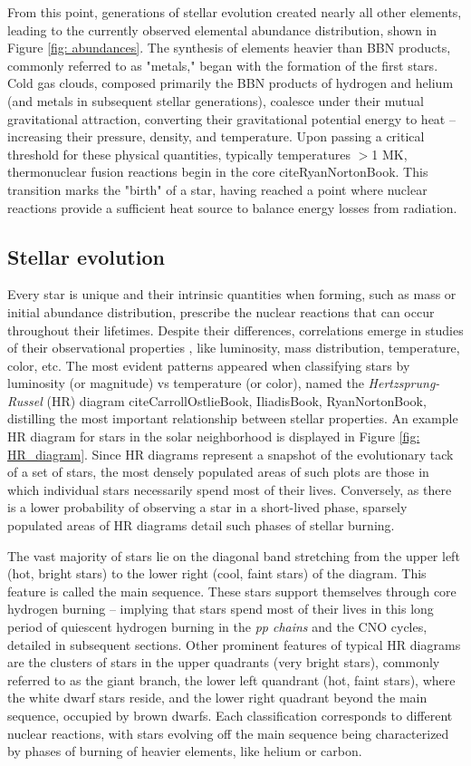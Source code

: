 From this point, generations of stellar evolution created nearly all other elements, leading to the currently observed elemental abundance distribution, shown in Figure \ref{fig: abundances}. The synthesis of elements heavier than BBN products, commonly referred to as "metals," began with the formation of the first stars. Cold gas clouds, composed primarily the BBN products of hydrogen and helium (and metals in subsequent stellar generations), coalesce under their mutual gravitational attraction, converting their gravitational potential energy to heat -- increasing their pressure, density, and temperature. Upon passing a critical threshold for these physical quantities, typically temperatures $>$1 MK, thermonuclear fusion reactions begin in the core cite{RyanNortonBook}. This transition marks the "birth" of a star, having reached a point where nuclear reactions provide a sufficient heat source to balance energy losses from radiation. 


\subsection{Stellar evolution}

Every star is unique and their intrinsic quantities when forming, such as mass or initial abundance distribution, prescribe the nuclear reactions that can occur throughout their lifetimes. Despite their differences, correlations emerge in studies of their observational properties , like luminosity, mass distribution, temperature, color, etc. The most evident patterns appeared when classifying stars by luminosity (or magnitude) vs temperature (or color), named the \textit{Hertzsprung-Russel} (HR) diagram cite{CarrollOstlieBook, IliadisBook, RyanNortonBook}, distilling the most important relationship between stellar properties. An example HR diagram for stars in the solar neighborhood is displayed in Figure \ref{fig: HR_diagram}. Since HR diagrams represent a snapshot of the evolutionary tack of a set of stars, the most densely populated areas of such plots are those in which individual stars necessarily spend most of their lives. Conversely, as there is a lower probability of observing a star in a short-lived phase, sparsely populated areas of HR diagrams detail such phases of stellar burning. 

The vast majority of stars lie on the diagonal band stretching from the upper left (hot, bright stars) to the lower right (cool, faint stars) of the diagram. This feature is called the main sequence. These stars support themselves through core hydrogen burning -- implying that stars spend most of their lives in this long period of quiescent hydrogen burning in the \textit{pp chains} and the CNO cycles, detailed in subsequent sections. Other prominent features of typical HR diagrams are the clusters of stars in the upper quadrants (very bright stars), commonly referred to as the giant branch, the lower left quandrant (hot, faint stars), where the white dwarf stars reside, and the lower right quadrant beyond the main sequence, occupied by brown dwarfs. Each classification corresponds to different nuclear reactions, with stars evolving off the main sequence being characterized by phases of burning of heavier elements, like helium or carbon. 

